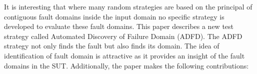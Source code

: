 \documentclass{acm_proc_article-sp}
\begin{document}







It is interesting that where many random strategies are based on the principal of contiguous fault domains inside the input domain no specific strategy is developed to evaluate these fault domains. This paper describes a new test strategy called Automated Discovery of Failure Domain (ADFD). The ADFD strategy not only finds the fault but also finds its domain. The idea of identification of fault domain is attractive as it provides an insight of the fault domains in the SUT. Additionally, the paper makes the following contributions:
\end{document}
